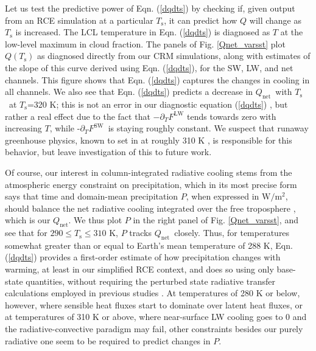 \documentclass[10pt]{article}
\newcommand{\eqnref}[1]{(\ref{#1})}
\newcommand{\ppt}{\ensuremath{\partial_T}}
\newcommand{\Qnet}{\ensuremath{Q_\mathrm{net}}}
\newcommand{\FLW}{\ensuremath{F^\mathrm{LW}}}
\newcommand{\FSW}{\ensuremath{F^\mathrm{SW}}}
\newcommand{\Ts}{\ensuremath{T_\mathrm{s}}}
\begin{document}
Let us test the predictive power of Eqn. \eqnref{dqdts} by checking if, given output from an RCE simulation at a particular \Ts, it can predict how $Q$ will change as $\Ts$ is increased. The LCL temperature in Eqn. \eqnref{dqdts}  is diagnosed as $T$ at the low-level maximum in cloud fraction. The panels of Fig. \ref{Qnet_varsst} plot $Q(\Ts)$ as diagnosed directly from our CRM simulations, along with estimates of the slope of this curve derived using  Eqn. \eqnref{dqdts}, for the SW, LW, and net  channels. This figure shows that Eqn. \eqnref{dqdts}  captures the changes in  cooling in all channels. We also see that  Eqn. \eqnref{dqdts} predicts a decrease in  \Qnet\ with \Ts\ at \Ts=320 K; this is not an error in our diagnostic equation \eqnref{dqdts} , but rather a real effect due to the fact that $-\ppt \FLW$ tends towards zero with increasing $T$, while -\ppt \FSW\ is staying roughly constant. We suspect that runaway greenhouse physics, known to set in at roughly 310 K \citep{goldblatt2013}, is responsible for this behavior, but leave investigation of this to future work.

Of course,  our interest in column-integrated radiative cooling stems from the atmospheric energy constraint on precipitation, which in its most precise form says that time and domain-mean precipitation $P$, when expressed in $\mathrm{W/m^2}$, should balance the net radiative cooling integrated over the free troposphere \citep{ogorman2012}, which is our \Qnet. We thus plot $P$ in the right panel of Fig. \ref{Qnet_varsst}, and see that for $290\leq \Ts \leq 310$ K,  $P$ tracks \Qnet\ closely.  Thus, for temperatures somewhat greater than or equal to Earth's mean temperature of 288 K,  Eqn. \eqnref{dqdts} provides a first-order estimate of how precipitation changes with warming, at least in our simplified RCE context, and does so using only base-state quantities, without requiring the perturbed state radiative transfer calculations employed in previous studies \citep[e.g.][]{pendergrass2014,ogorman2012, held2006}. At temperatures of 280 K or below, however, where sensible heat fluxes start to dominate over latent heat fluxes, or at temperatures of 310 K or above, where near-surface LW cooling goes to 0 and the radiative-convective paradigm may fail, other constraints besides our purely radiative one seem to be required to predict changes in $P$.

\end{document}

